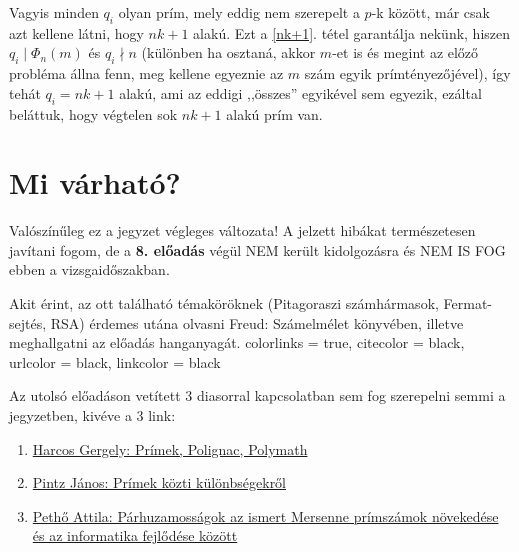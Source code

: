\documentclass[12pt]{book}
\theoremstyle{plain} %
\theoremstyle{definition} %
\theoremstyle{remark}
\numberwithin{equation}{section}  %
\begin{document}
	Vagyis minden $q_i$ olyan prím, mely eddig nem szerepelt a $p$-k között, már csak azt kellene látni, hogy $nk+1$ alakú. Ezt a \ref{nk+1}. tétel garantálja nekünk, hiszen $q_i\mid \Phi_n(m)$ és $q_i \nmid n$ (különben ha osztaná, akkor $m$-et is és megint az előző probléma állna fenn, meg kellene egyeznie az $m$ szám egyik prímtényezőjével), így tehát $q_i = nk+1$ alakú, ami az eddigi ,,összes'' egyikével sem egyezik, ezáltal beláttuk, hogy végtelen sok $nk+1$ alakú prím van.
	
	
	
	
	
	
	
	\chapter*{Mi várható?}
	
	Valószínűleg ez a jegyzet végleges változata! A jelzett hibákat természetesen javítani fogom, de a \textbf{8. előadás} végül NEM került kidolgozásra és NEM IS FOG ebben a vizsgaidőszakban.
	
	Akit érint, az ott található témaköröknek (Pitagoraszi számhármasok, Fermat-sejtés, RSA) érdemes utána olvasni Freud: Számelmélet könyvében, illetve meghallgatni az előadás hanganyagát.
	\hypersetup
	{
		colorlinks = true,
		citecolor  = black,
		urlcolor   = black,
		linkcolor  = black
	}
	
	Az utolsó előadáson vetített 3 diasorral kapcsolatban sem fog szerepelni semmi a jegyzetben, kivéve a 3 link:
	\begin{enumerate}
		\item{\href{https://www.renyi.hu/~gharcos/slides_polignac_mta.pdf}{Harcos Gergely: Prímek, Polignac, Polymath}}
		\item{\href{http://web.cs.elte.hu/~csaba/bboard/2016/PJ_MTA_nov_beamer.pdf}{Pintz János: Prímek közti különbségekről}}
		\item{\href{http://web.cs.elte.hu/~csaba/bboard/2016/Mersenne_2016_final.pdf}{Pethő Attila: Párhuzamosságok az ismert Mersenne prímszámok növekedése és az informatika fejlődése között}}
	\end{enumerate}
\end{document}
